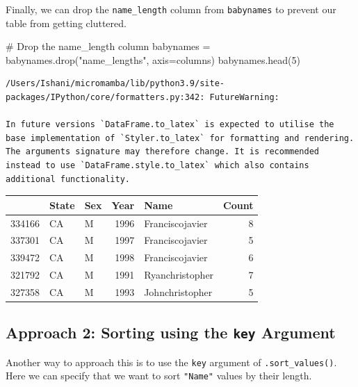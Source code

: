 \documentclass[
  letterpaper,
  DIV=11,
  numbers=noendperiod]{scrreprt}
\newenvironment{Shaded}{\begin{snugshade}}{\end{snugshade}}
\newcommand{\CommentTok}[1]{\textcolor[rgb]{0.37,0.37,0.37}{#1}}
\newcommand{\DecValTok}[1]{\textcolor[rgb]{0.68,0.00,0.00}{#1}}
\newcommand{\NormalTok}[1]{\textcolor[rgb]{0.00,0.23,0.31}{#1}}
\newcommand{\OperatorTok}[1]{\textcolor[rgb]{0.37,0.37,0.37}{#1}}
\newcommand{\StringTok}[1]{\textcolor[rgb]{0.13,0.47,0.30}{#1}}
\begin{document}
Finally, we can drop the \texttt{name\_length} column from
\texttt{babynames} to prevent our table from getting cluttered.

\begin{Shaded}
\begin{Highlighting}[]
\CommentTok{\# Drop the \textquotesingle{}name\_length\textquotesingle{} column}
\NormalTok{babynames }\OperatorTok{=}\NormalTok{ babynames.drop(}\StringTok{"name\_lengths"}\NormalTok{, axis}\OperatorTok{=}\StringTok{\textquotesingle{}columns\textquotesingle{}}\NormalTok{)}
\NormalTok{babynames.head(}\DecValTok{5}\NormalTok{)}
\end{Highlighting}
\end{Shaded}

\begin{verbatim}
/Users/Ishani/micromamba/lib/python3.9/site-packages/IPython/core/formatters.py:342: FutureWarning:

In future versions `DataFrame.to_latex` is expected to utilise the base implementation of `Styler.to_latex` for formatting and rendering. The arguments signature may therefore change. It is recommended instead to use `DataFrame.style.to_latex` which also contains additional functionality.
\end{verbatim}

\begin{tabular}{lllrlr}
\toprule
{} & State & Sex &  Year &             Name &  Count \\
\midrule
334166 &    CA &   M &  1996 &  Franciscojavier &      8 \\
337301 &    CA &   M &  1997 &  Franciscojavier &      5 \\
339472 &    CA &   M &  1998 &  Franciscojavier &      6 \\
321792 &    CA &   M &  1991 &  Ryanchristopher &      7 \\
327358 &    CA &   M &  1993 &  Johnchristopher &      5 \\
\bottomrule
\end{tabular}

\hypertarget{approach-2-sorting-using-the-key-argument}{%
\subsection{\texorpdfstring{Approach 2: Sorting using the \texttt{key}
Argument}{Approach 2: Sorting using the key Argument}}\label{approach-2-sorting-using-the-key-argument}}

Another way to approach this is to use the \texttt{key} argument of
\texttt{.sort\_values()}. Here we can specify that we want to sort
\texttt{"Name"} values by their length.
\end{document}
